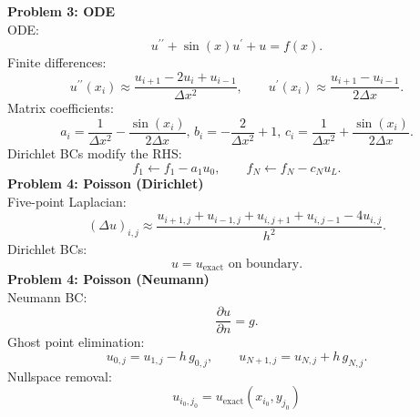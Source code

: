 \documentclass[11pt]{article}
\begin{document}
\textbf{Problem 3: ODE}\\
ODE:
$$u^{\prime\prime}+\sin(x)u^\prime+u=f(x).$$
Finite differences:
$$u^{\prime\prime}(x_i)\approx\frac{u_{i+1}-2u_i+u_{i-1}}{\Delta x^2},\qquad u^\prime(x_i)\approx \frac{u_{i+1}-u_{i-1}}{2\Delta x}.$$
Matrix coefficients:
$$a_i = \frac{1}{\Delta x^2}-\frac{\sin(x_i)}{2\Delta x},\,b_i=-\frac{2}{\Delta x^2}+1,\,c_i = \frac{1}{\Delta x^2}+\frac{\sin(x_i)}{2\Delta x}.$$
Dirichlet BCs modify the RHS:
$$f_1\leftarrow f_1-a_1u_0,\qquad f_N\leftarrow f_N-c_Nu_L.$$
\textbf{Problem 4: Poisson (Dirichlet)} \\
Five-point Laplacian:
$$(\Delta u)_{i,j}\approx \frac{u_{i+1,j}+u_{i-1,j}+u_{i,j+1}+u_{i,j-1}-4u_{i,j}}{h^2}.$$
Dirichlet BCs:
$$u = u_{\text{exact}}\text{ on boundary}.$$
\textbf{Problem 4: Poisson (Neumann)} \\
Neumann BC:
$$\frac{\partial u}{\partial n}=g.$$
Ghost point elimination:
$$u_{0,j}=u_{1,j}-h\,g_{0,j},\qquad u_{N+1,j}=u_{N,j}+h\,g_{N,j}.$$
Nullspace removal:
$$u_{i_0,j_0} = u_\text{exact}(x_{i_0},y_{j_0})$$
\end{document}
